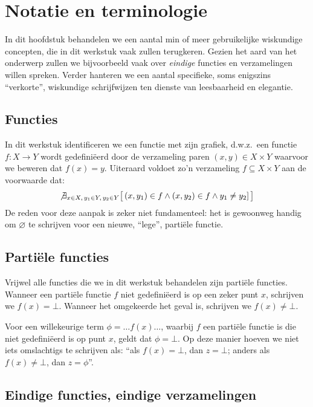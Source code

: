 \chapter{Notatie en terminologie}

In dit hoofdstuk behandelen we een aantal min of meer gebruikelijke wiskundige concepten, die in dit werkstuk vaak zullen terugkeren. Gezien het aard van het onderwerp zullen we bijvoorbeeld vaak over \emph{eindige} functies en verzamelingen willen spreken. Verder hanteren we een aantal specifieke, soms enigszins ``verkorte'', wiskundige schrijfwijzen ten dienste van leesbaarheid en elegantie.

\section{Functies}

In dit werkstuk identificeren we een functie met zijn grafiek, d.w.z.~een functie $f : X \to Y$ wordt gedefiniëerd door de verzameling paren $(x, y) \in X \times Y$ waarvoor we beweren dat $f(x) = y$. Uiteraard voldoet zo'n verzameling $f \subseteq X \times Y$ aan de voorwaarde dat: $$ \not \exists_{x \in X,\, y_1 \in Y,\, y_2 \in Y} \big[\, (x, y_1) \in f \land (x, y_2) \in f \land y_1 \neq y_2 ] \,\big] $$ De reden voor deze aanpak is zeker niet fundamenteel: het is gewoonweg handig om $\varnothing$ te schrijven voor een nieuwe, ``lege'', partiële functie.

\section{Partiële functies}

Vrijwel alle functies die we in dit werkstuk behandelen zijn partiële functies. Wanneer een partiële functie $f$ niet gedefiniëerd is op een zeker punt $x$, schrijven we $f(x) = \bot$. Wanneer het omgekeerde het geval is, schrijven we $f(x) \neq \bot$.

Voor een willekeurige term $\phi = \dots f(x)\dots$, waarbij $f$ een partiële functie is die niet gedefiniëerd is op punt $x$, geldt dat $\phi = \bot$. Op deze manier hoeven we niet iets omslachtigs te schrijven als: ``als $f(x) = \bot$, dan $z = \bot$; anders als $f(x) \neq \bot$, dan $z = \phi$''.

\section{Eindige functies, eindige verzamelingen}

